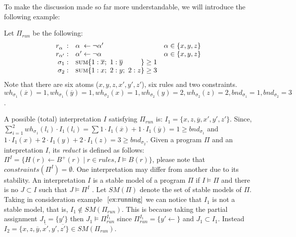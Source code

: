 To make the discussion made so far more understandable, we will introduce the following example:
\begin{example}
    \label{ex:running}
    Let $\Pi_{\mathit{run}}$ be the following:
    \begin{align*}
        \begin{array}{rll}
            r_{\alpha\phantom{'}}: & \alpha\phantom{'} \leftarrow \neg \alpha' & \alpha \in \{x,y,z\}\\
            r_{\alpha'}: & \alpha' \leftarrow \neg \alpha & \alpha \in \{x,y,z\}\\ 
            \sigma_{1}: & \textsc{sum}\{
                1 : \overline{x};\ 1 : \overline{y}\phantom{;\ 2 : z}
            \} \geq 1 \\
            \sigma_{2}: & \textsc{sum}\{
                1 : x;\ 2 : y;\ 2 : z
            \} \geq 3
        \end{array}
    \end{align*}
Note that there are six atoms ($x,y,z,x',y',z'$), six rules and two constraints.
$\mathit{wh}_{\sigma_1}(\overline{x}) = 1, \mathit{wh}_{\sigma_1}(\overline{y}) = 1,
\mathit{wh}_{\sigma_2}(x) = 1,\mathit{wh}_{\sigma_2}(y) = 2,
\mathit{wh}_{\sigma_2}(z) = 2, \mathit{bnd}_{\sigma_1}=1,\mathit{bnd}_{\sigma_2}=3$.
\end{example}
A possible (total) interpretation $I$ satisfying $\Pi_{\mathit{run}}$ is:
$I_1 = \{ x, z, \overline{y}, x', y', z' \}$.
Since, $\sum_{i=1}^{2} \mathit{wh}_{\sigma_1}(l_i) \cdot I_1(l_i) = 
\sum 1 \cdot I_1(\overline{x}) + 1 \cdot I_1(\overline{y}) = 1 \ge \mathit{bnd}_{\sigma_1}$
and $1 \cdot I_1(x) + 2 \cdot I_1(y) + 2 \cdot I_1(z) = 3 \ge \mathit{bnd}_{\sigma_2}$.
Given a program $\Pi$ and an intepretation $I$, its \textit{reduct} is
defined as follows: $\Pi^{I} = \{ H(r) \leftarrow B^+(r) \mid r \in \mathit{rules}, I \models B(r)\}$,
please note that $\mathit{constraints}(\Pi^{I}) = \emptyset$.
One interpretation may differ from another due to its stability.
An interpretation $I$ is a stable model of a program $\Pi$ if $I \models \Pi$ and there is 
no $J \subset I$ such that $J \models \Pi^I$ .
Let $\mathit{SM}(\Pi)$ denote the set of stable models of $\Pi$.
Taking in consideration example $~\ref{ex:running}$ we can notice that 
$I_1$ is not a stable model, that is, $I_1 \not\in \mathit{SM}(\Pi_{\mathit{run}})$.
This is because taking the partial assignment $J_1 = \{y'\}$
then $ J_1  \models \Pi_{\mathit{run}}^{I_1}$ since $\Pi_{\mathit{run}}^{I_1} = \{ y' \leftarrow  \}$
and $J_1 \subset I_1$.
Instead $I_2 = \{ x, z, \overline{y}, \overline{x'}, y', \overline{z'} \} \in \mathit{SM}(\Pi_{\mathit{run}})$.

